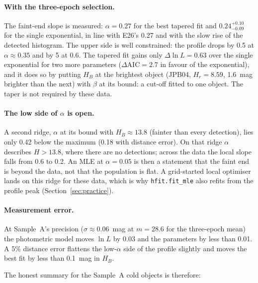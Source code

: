 \documentclass[11pt,a4paper]{article}
\begin{document}
\paragraph{With the three-epoch selection.}
The faint-end slope is measured: $\alpha = 0.27$ for the best tapered fit and
$0.24^{+0.10}_{-0.09}$ for the single exponential, in line with E26's 0.27
and with the slow rise of the detected histogram.  The upper side is well
constrained: the profile drops by 0.5 at $\alpha\approx0.35$ and by 5 at 0.6.  The tapered fit gains only
$\Delta\ln L=0.63$ over the single exponential for two more parameters
($\Delta\mathrm{AIC}=2.7$ in favour of the exponential), and it does so by
putting $H_B$ at the brightest object (JPB04, $H_r=8.59$, 1.6~mag brighter
than the next) with $\beta$ at its bound: a cut-off fitted to one object.
The taper is not required by these data.

\paragraph{The low side of $\alpha$ is open.}
A second ridge, $\alpha$ at its bound with $H_B\approx13.8$ (fainter than
every detection), lies only 0.42 below the maximum (0.18 with distance error).
On that ridge $\alpha$ describes $H>13.8$, where there are no detections;
across the data the local slope falls from 0.6 to 0.2.  An MLE at
$\alpha=0.05$ is then a statement that the faint end is beyond the data, not
that the population is flat.  A grid-started local optimiser lands on this
ridge for these data, which is why \texttt{hfit.fit\_mle} also refits from
the profile peak (Section~\ref{sec:practice}).

\paragraph{Measurement error.}
At Sample~A's precision ($\sigma\approx0.06$~mag at $m=28.6$ for the
three-epoch mean) the photometric model moves $\ln L$ by 0.03 and the
parameters by less than 0.01.  A 5\% distance error flattens the low-$\alpha$
side of the profile slightly and moves the best fit by less than 0.1~mag in
$H_B$.

The honest summary for the Sample~A cold objects is therefore:
\end{document}
